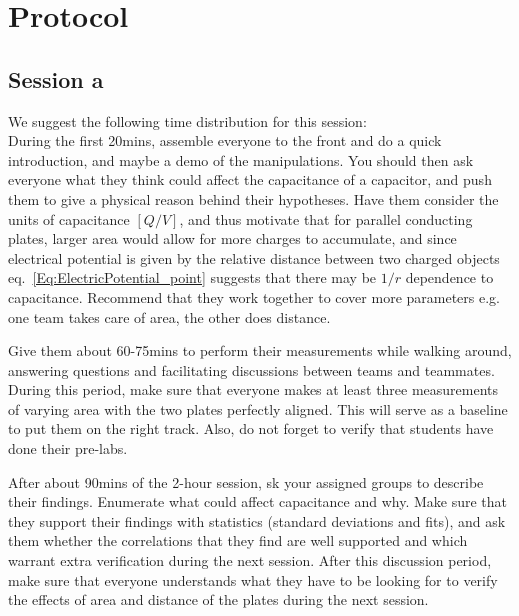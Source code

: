 \documentclass[12pt]{report}
\begin{document}

\section{Protocol}
\subsection{Session a}
\begin{tcolorbox}[title=Session \#1]
We suggest the following time distribution for this session:\\

During the first 20mins, assemble everyone to the front and do a quick introduction, and maybe a  demo of the manipulations. You should then ask everyone what they think could affect the capacitance of a capacitor, and push them to give a physical reason behind their hypotheses. Have them consider the units of capacitance $[Q/V]$, and thus motivate that for parallel conducting plates, larger area would allow for more charges to accumulate, and since electrical potential is given by the relative distance between two charged objects eq.~\eqref{Eq:ElectricPotential_point} suggests that there may be $1/r$ dependence to capacitance. Recommend that they work together to cover more parameters e.g. one team takes care of area, the other does distance.
\end{tcolorbox}

\begin{tcolorbox}
Give them about 60-75mins to perform their measurements while walking around, answering questions and facilitating discussions between teams and teammates. During this period, make sure that everyone makes at least three measurements of varying area with the two plates perfectly aligned. This will serve as a baseline to put them on the right track. Also, do not forget to verify that students have done their pre-labs.
\end{tcolorbox}

\begin{tcolorbox}
After about 90mins of the 2-hour session, sk your assigned groups to describe their findings. Enumerate what could affect capacitance and why. Make sure that they support their findings with statistics (standard deviations and fits), and ask them whether the correlations that they find are well supported and which warrant extra verification during the next session. After this discussion period, make sure that everyone understands what they have to be looking for to verify the effects of area and distance of the plates during the next session.
\end{tcolorbox}
\end{document}
